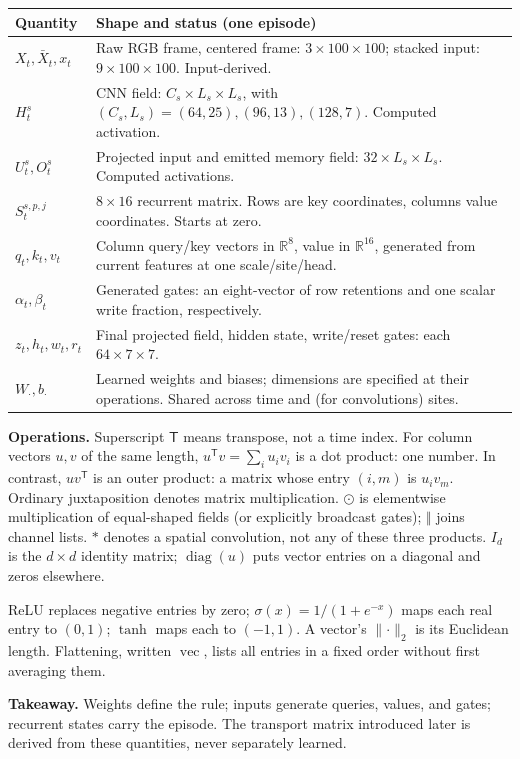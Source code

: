 \documentclass[10pt,letterpaper]{article}
\newcommand{\R}{\mathbb{R}}
\newcommand{\cat}{\mathbin\Vert}
\newcommand{\takeaway}[1]{\par\smallskip\noindent\textbf{Takeaway.} #1}
\begin{document}
\begin{tabularx}{\linewidth}{@{}lX@{}}\toprule
Quantity & Shape and status (one episode)\\\midrule
$X_t,\bar X_t,x_t$ & Raw RGB frame, centered frame: $3\times100\times100$; stacked input: $9\times100\times100$. Input-derived.\\
$H_t^s$ & CNN field: $C_s\times L_s\times L_s$, with $(C_s,L_s)=(64,25),(96,13),(128,7)$. Computed activation.\\
$U_t^s,O_t^s$ & Projected input and emitted memory field: $32\times L_s\times L_s$. Computed activations.\\
$S_t^{s,p,j}$ & $8\times16$ recurrent matrix. Rows are key coordinates, columns value coordinates. Starts at zero.\\
$q_t,k_t,v_t$ & Column query/key vectors in $\R^8$, value in $\R^{16}$, generated from current features at one scale/site/head.\\
$\alpha_t,\beta_t$ & Generated gates: an eight-vector of row retentions and one scalar write fraction, respectively.\\
$z_t,h_t,w_t,r_t$ & Final projected field, hidden state, write/reset gates: each $64\times7\times7$.\\
$W_{\cdot},b_{\cdot}$ & Learned weights and biases; dimensions are specified at their operations. Shared across time and (for convolutions) sites.\\\bottomrule
\end{tabularx}

\textbf{Operations.} Superscript $\mathsf T$ means transpose, not a time index. For column vectors $u,v$ of the same length, $u^{\mathsf T}v=\sum_i u_i v_i$ is a dot product: one number. In contrast, $uv^{\mathsf T}$ is an outer product: a matrix whose entry $(i,m)$ is $u_i v_m$. Ordinary juxtaposition denotes matrix multiplication. $\odot$ is elementwise multiplication of equal-shaped fields (or explicitly broadcast gates); $\cat$ joins channel lists. $*$ denotes a spatial convolution, not any of these three products. $I_d$ is the $d\times d$ identity matrix; $\operatorname{diag}(u)$ puts vector entries on a diagonal and zeros elsewhere.

ReLU replaces negative entries by zero; $\sigma(x)=1/(1+e^{-x})$ maps each real entry to $(0,1)$; $\tanh$ maps each to $(-1,1)$. A vector's $\lVert\cdot\rVert_2$ is its Euclidean length. Flattening, written $\operatorname{vec}$, lists all entries in a fixed order without first averaging them.
\takeaway{Weights define the rule; inputs generate queries, values, and gates; recurrent states carry the episode. The transport matrix introduced later is derived from these quantities, never separately learned.}
\end{document}
